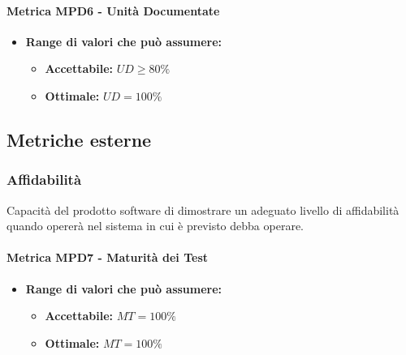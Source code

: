 \paragraph{Metrica MPD6 - Unità Documentate} 
\begin{itemize}
    \item \textbf{Range di valori che può assumere:}
    \begin{itemize}
        \item \textbf{Accettabile:} $UD \geq 80\%  $
        \item \textbf{Ottimale:} $UD = 100\%$
    \end{itemize}
\end{itemize}
              
       
\subsection{Metriche esterne}

\subsubsection{Affidabilità}
Capacità del prodotto software di dimostrare un adeguato livello di affidabilità quando opererà nel sistema in cui è previsto debba operare.
    
\paragraph{Metrica MPD7 - Maturità dei Test} 
\begin{itemize}
    \item \textbf{Range di valori che può assumere:}
    \begin{itemize}
        \item \textbf{Accettabile:} $MT = 100\% $
        \item \textbf{Ottimale:} $MT = 100\% $
    \end{itemize}
\end{itemize}
       
